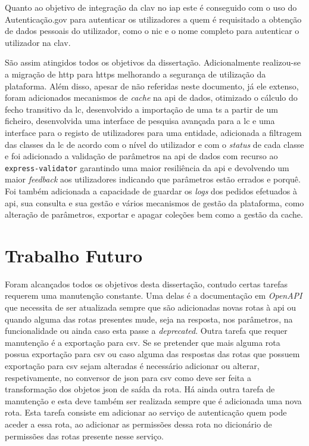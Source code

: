 Quanto ao objetivo de integração da \acrshort{clav} no \acrshort{iap} este é conseguido com o uso do Autenticação.gov para autenticar os utilizadores a quem é requisitado a obtenção de dados pessoais do utilizador, como o \acrshort{nic} e o nome completo para autenticar o utilizador na \acrshort{clav}.

São assim atingidos todos os objetivos da dissertação. Adicionalmente realizou-se a migração de \acrshort{http} para \acrshort{https} melhorando a segurança de utilização da plataforma. Além disso, apesar de não referidas neste documento, já ele extenso, foram adicionados mecanismos de \textit{cache} na \acrshort{api} de dados, otimizado o cálculo do fecho transitivo da \acrshort{lc}, desenvolvido a importação de uma \acrshort{ts} a partir de um ficheiro, desenvolvida uma interface de pesquisa avançada para a \acrshort{lc} e uma interface para o registo de utilizadores para uma entidade, adicionada a filtragem das classes da \acrshort{lc} de acordo com o nível do utilizador e com o \textit{status} de cada classe e foi adicionado a validação de parâmetros na \acrshort{api} de dados com recurso ao \texttt{express-validator} garantindo uma maior resiliência da \acrshort{api} e devolvendo um maior \textit{feedback} aos utilizadores indicando que parâmetros estão errados e porquê. Foi também adicionada a capacidade de guardar os \textit{logs} dos pedidos efetuados à \acrshort{api}, sua consulta e sua gestão e vários mecanismos de gestão da plataforma, como alteração de parâmetros, exportar e apagar coleções bem como a gestão da cache.

\section{Trabalho Futuro}

Foram alcançados todos os objetivos desta dissertação, contudo certas tarefas requerem uma manutenção constante. Uma delas é a documentação em \textit{OpenAPI} que necessita de ser atualizada sempre que são adicionadas novas rotas à \acrshort{api} ou quando alguma das rotas presentes mude, seja na resposta, nos parâmetros, na funcionalidade ou ainda caso esta passe a \textit{deprecated}. Outra tarefa que requer manutenção é a exportação para \acrshort{csv}. Se se pretender que mais alguma rota possua exportação para \acrshort{csv} ou caso alguma das respostas das rotas que possuem exportação para \acrshort{csv} sejam alteradas é necessário adicionar ou alterar, respetivamente, no conversor de \acrshort{json} para \acrshort{csv} como deve ser feita a transformação dos objetos \acrshort{json} de saída da rota. Há ainda outra tarefa de manutenção e esta deve também ser realizada sempre que é adicionada uma nova rota. Esta tarefa consiste em adicionar ao serviço de autenticação quem pode aceder a essa rota, ao adicionar as permissões dessa rota no dicionário de permissões das rotas presente nesse serviço.

